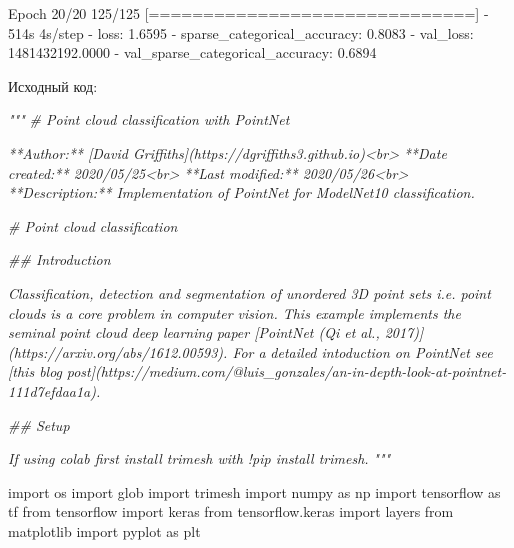 \documentclass[
  12pt,
  a4paper,
]{article}
\newenvironment{Shaded}{}{}
\newcommand{\BuiltInTok}[1]{#1}
\newcommand{\CommentTok}[1]{\textcolor[rgb]{0.38,0.63,0.69}{\textit{#1}}}
\newcommand{\DecValTok}[1]{\textcolor[rgb]{0.25,0.63,0.44}{#1}}
\newcommand{\FloatTok}[1]{\textcolor[rgb]{0.25,0.63,0.44}{#1}}
\newcommand{\ImportTok}[1]{#1}
\newcommand{\NormalTok}[1]{#1}
\newcommand{\OperatorTok}[1]{\textcolor[rgb]{0.40,0.40,0.40}{#1}}
\begin{document}
\begin{Shaded}
\begin{Highlighting}[]
\NormalTok{Epoch }\DecValTok{20}\OperatorTok{/}\DecValTok{20}
\DecValTok{125}\OperatorTok{/}\DecValTok{125} \OperatorTok{[==============================]} \OperatorTok{{-}} \DecValTok{514}\BuiltInTok{s} \DecValTok{4}\BuiltInTok{s}\OperatorTok{/}\NormalTok{step }\OperatorTok{{-}}\NormalTok{ loss}\OperatorTok{:} \FloatTok{1.6595} \OperatorTok{{-}}\NormalTok{ sparse\_categorical\_accuracy}\OperatorTok{:} \FloatTok{0.8083} \OperatorTok{{-}}\NormalTok{ val\_loss}\OperatorTok{:} \FloatTok{1481432192.0000} \OperatorTok{{-}}\NormalTok{ val\_sparse\_categorical\_accuracy}\OperatorTok{:} \FloatTok{0.6894}
\end{Highlighting}
\end{Shaded}

Исходный код:

\begin{Shaded}
\begin{Highlighting}[]
\CommentTok{"""}
\CommentTok{\# Point cloud classification with PointNet}

\CommentTok{**Author:** [David Griffiths](https://dgriffiths3.github.io)\textless{}br\textgreater{}}
\CommentTok{**Date created:** 2020/05/25\textless{}br\textgreater{}}
\CommentTok{**Last modified:** 2020/05/26\textless{}br\textgreater{}}
\CommentTok{**Description:** Implementation of PointNet for ModelNet10 classification.}

\CommentTok{\# Point cloud classification}

\CommentTok{\#\# Introduction}

\CommentTok{Classification, detection and segmentation of unordered 3D point sets i.e. point clouds}
\CommentTok{is a core problem in computer vision. This example implements the seminal point cloud}
\CommentTok{deep learning paper [PointNet (Qi et al., 2017)](https://arxiv.org/abs/1612.00593). For a}
\CommentTok{detailed intoduction on PointNet see [this blog}
\CommentTok{post](https://medium.com/@luis\_gonzales/an{-}in{-}depth{-}look{-}at{-}pointnet{-}111d7efdaa1a).}

\CommentTok{\#\# Setup}

\CommentTok{If using colab first install trimesh with \textasciigrave{}!pip install trimesh\textasciigrave{}.}
\CommentTok{"""}

\ImportTok{import}\NormalTok{ os}
\ImportTok{import}\NormalTok{ glob}
\ImportTok{import}\NormalTok{ trimesh}
\ImportTok{import}\NormalTok{ numpy }\ImportTok{as}\NormalTok{ np}
\ImportTok{import}\NormalTok{ tensorflow }\ImportTok{as}\NormalTok{ tf}
\ImportTok{from}\NormalTok{ tensorflow }\ImportTok{import}\NormalTok{ keras}
\ImportTok{from}\NormalTok{ tensorflow.keras }\ImportTok{import}\NormalTok{ layers}
\ImportTok{from}\NormalTok{ matplotlib }\ImportTok{import}\NormalTok{ pyplot }\ImportTok{as}\NormalTok{ plt}


\end{Highlighting}
\end{Shaded}
\end{document}
